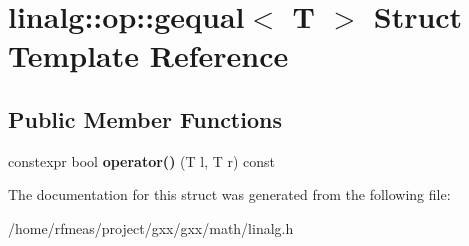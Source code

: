 \hypertarget{structlinalg_1_1op_1_1gequal}{}\section{linalg\+:\+:op\+:\+:gequal$<$ T $>$ Struct Template Reference}
\label{structlinalg_1_1op_1_1gequal}
\subsection*{Public Member Functions}
\begin{DoxyCompactItemize}
\item 
constexpr bool {\bfseries operator()} (T l, T r) const \hypertarget{structlinalg_1_1op_1_1gequal_a5fbdeafe8570acb26dd49d15727b442d}{}\label{structlinalg_1_1op_1_1gequal_a5fbdeafe8570acb26dd49d15727b442d}

\end{DoxyCompactItemize}


The documentation for this struct was generated from the following file\+:\begin{DoxyCompactItemize}
\item 
/home/rfmeas/project/gxx/gxx/math/linalg.\+h\end{DoxyCompactItemize}
